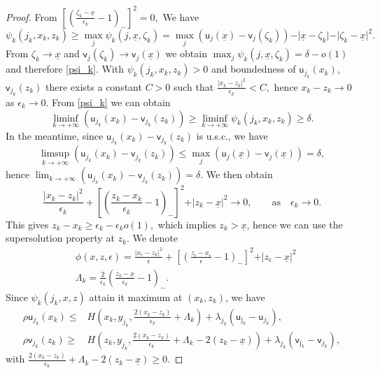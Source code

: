 \documentclass[11pt]{article}
\numberwithin{equation}{section}
\theoremstyle{Claim}
\newcommand{\ux}{{\underline x}}
\newcommand{\e}{\epsilon}
\theoremstyle{plain}
\begin{document}
\begin{proof}
From
$
\left[\left(\frac{\zeta_k-\ux}{\e_k}-1\right)_{-}\right]^2=0,
$
We have 
$$
\psi_k(j_{k}, x_{k},z_{k})\geq \max_j\psi_k(j,\ux,\zeta_k) =\max_j(\mathsf{u}_j(\ux)-\mathsf{v}_j(\zeta_k))-\vert \ux-\zeta_k\vert-\vert \zeta_k-\ux\vert^2.
$$
From $\zeta_k\to \ux$ and $\mathsf{v}_j(\zeta_k)\to \mathsf{v}_j(\ux)$ we obtain
$
\max_j\psi_k(j,\ux,\zeta_k) =\delta-o(1)
$
and therefore \cref{psi_k}. With $\psi_k(j_{k}, x_{k},z_{k})> 0$ and boundedness of $\mathsf{u}_{j_{k}}(x_{k})$, $\mathsf{v}_{j_{k}}(z_{k})$ there exists a constant $C>0$ such that 
$
\frac{\vert x_{k}-z_{k}\vert^2}{\e_k}<C,
$
hence $x_{k}-z_{k}\to 0$ as $\e_k\to 0$. From \cref{psi_k} we can obtain 
$$
\liminf_{k\to +\infty}(\mathsf{u}_{j_{k}}(x_{k})-\mathsf{v}_{j_{k}}(z_{k}))\geq \liminf_{k\to +\infty}\psi_k(j_{k},x_{k},z_{k})\geq \delta. 
$$
In the meantime, since $\mathsf{u}_{j_{k}}(x_{k})-\mathsf{v}_{j_{k}}(z_{k})$ is u.s.c., we have 
$$
\limsup_{k\to +\infty}(\mathsf{u}_{j_{k}}(x_{k})-\mathsf{v}_{j_{k}}(z_{k}))\leq \max_j(\mathsf{u}_j(\ux)-\mathsf{v}_j(\ux))=\delta,
$$
hence
$
\lim_{k\to +\infty}(\mathsf{u}_{j_{k}}(x_{k})-\mathsf{v}_{j_{k}}(z_{k}))=\delta. 
$
We then obtain 
\begin{equation*}
\frac{\vert x_{k}-z_{k}\vert^2}{\e_k}+
\left[\left(\frac{z_{k}-x_{k}}{\e_k}-1\right)_{-}\right]^2+
\vert z_{k}-\ux\vert^2\to 0,\qquad \text{as}\quad \e_k\to 0.
\end{equation*}
This gives 
$
z_{k}-x_{k}\geq \e_k-\e_ko(1),
$
which implies $z_{k}>\ux$, hence we can use the supersolution property at $z_{k}$. We denote
\begin{align*}
&\phi(x,z,\e)=\frac{\vert x_{\e }-z_{k}\vert^2}{\e }+
\left[\left(\frac{z_{\e }-x_{\e }}{\e }-1\right)_{-}\right]^2+
\vert z_{\e }-\ux\vert^2\\
&\Lambda_k=\frac{2}{\e_k}\left(\frac{z_{k}-\ux}{\e_k}-1\right)_{-}.
\end{align*}
Since $\psi_k(j_{k},x,z)$ attain it maximum at $(x_{k},z_{k})$, we have
\begin{align*}
\rho \mathsf{u}_{j_{k}}(x_{k}) \leq &H\left(x_{k},y_{j_{k}},\frac{2( x_{k}-z_{k} )}{\e_k}+\Lambda_k \right)+\lambda_{j_{k}}\left(\mathsf{u}_{\bar{\jmath}_{k}}-\mathsf{u}_{j_{k}}\right),\\
\rho \mathsf{v}_{j_{k}}(z_{k}) \geq & H\left(z_{k},y_{j_{k}},\frac{2( x_{k}-z_{k} )}{\e_k}+\Lambda_k-2(z_{k}-\ux) \right)+\lambda_{j_{k}}\left(\mathsf{v}_{\bar{\jmath}_{k}}-\mathsf{v}_{j_{k}}\right),
\end{align*}
with $\frac{2( x_{k}-z_{k} )}{\e_k}+\Lambda_k-2(z_{k}-\ux)\geq 0$. \par

\end{proof}
\end{document}
